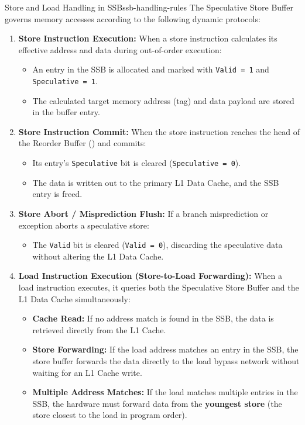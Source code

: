 \begin{definition}{Store and Load Handling in SSB}{ssb-handling-rules}
The Speculative Store Buffer governs memory accesses according to the following dynamic protocols:
\begin{enumerate}
    \item \textbf{Store Instruction Execution:} When a store instruction calculates its effective address and data during out-of-order execution:
    \begin{itemize}
        \item An entry in the SSB is allocated and marked with \texttt{Valid = 1} and \texttt{Speculative = 1}.
        \item The calculated target memory address (tag) and data payload are stored in the buffer entry.
    \end{itemize}
    \item \textbf{Store Instruction Commit:} When the store instruction reaches the head of the Reorder Buffer () and commits:
    \begin{itemize}
        \item Its entry's \texttt{Speculative} bit is cleared (\texttt{Speculative = 0}).
        \item The data is written out to the primary L1 Data Cache, and the SSB entry is freed.
    \end{itemize}
    \item \textbf{Store Abort / Misprediction Flush:} If a branch misprediction or exception aborts a speculative store:
    \begin{itemize}
        \item The \texttt{Valid} bit is cleared (\texttt{Valid = 0}), discarding the speculative data without altering the L1 Data Cache.
    \end{itemize}
    \item \textbf{Load Instruction Execution (Store-to-Load Forwarding):} When a load instruction executes, it queries both the Speculative Store Buffer and the L1 Data Cache simultaneously:
    \begin{itemize}
        \item \textbf{Cache Read:} If no address match is found in the SSB, the data is retrieved directly from the L1 Cache.
        \item \textbf{Store Forwarding:} If the load address matches an entry in the SSB, the store buffer forwards the data directly to the load bypass network without waiting for an L1 Cache write.
        \item \textbf{Multiple Address Matches:} If the load matches multiple entries in the SSB, the hardware must forward data from the \textbf{youngest store} (the store closest to the load in program order).
    \end{itemize}
\end{enumerate}
\end{definition}

